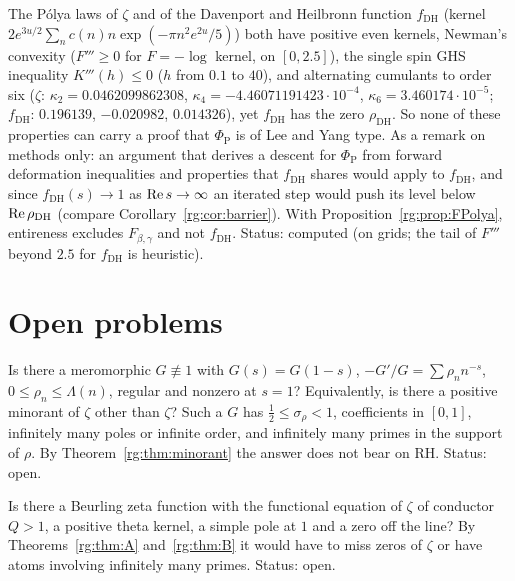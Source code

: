 \begin{remark}\label{rg:rem:dhtests}
The P\'olya laws of $\zeta$ and of the Davenport and Heilbronn function $f_{\mathrm{DH}}$ (kernel $2e^{3u/2}\sum_nc(n)n\exp(-\pi n^2e^{2u}/5)$) both have positive even kernels, Newman's convexity ($F'''\ge0$ for $F=-\log$ kernel, on $[0,2.5]$), the single spin GHS inequality $K'''(h)\le0$ ($h$ from $0.1$ to $40$), and alternating cumulants to order six ($\zeta$: $\kappa_2=0.0462099862308$, $\kappa_4=-4.46071191423\cdot10^{-4}$, $\kappa_6=3.460174\cdot10^{-5}$; $f_{\mathrm{DH}}$: $0.196139$, $-0.020982$, $0.014326$), yet $f_{\mathrm{DH}}$ has the zero $\rho_{\mathrm{DH}}$. So none of these properties can carry a proof that $\Phi_{\mathrm P}$ is of Lee and Yang type. As a remark on methods only: an argument that derives a descent for $\Phi_{\mathrm P}$ from forward deformation inequalities and properties that $f_{\mathrm{DH}}$ shares would apply to $f_{\mathrm{DH}}$, and since $f_{\mathrm{DH}}(s)\to1$ as $\operatorname{Re} s\to\infty$ an iterated step would push its level below $\operatorname{Re}\rho_{\mathrm{DH}}$ (compare Corollary~\ref{rg:cor:barrier}). With Proposition~\ref{rg:prop:FPolya}, entireness excludes $F_{\beta,\gamma}$ and not $f_{\mathrm{DH}}$. Status: computed (on grids; the tail of $F'''$ beyond $2.5$ for $f_{\mathrm{DH}}$ is heuristic).
\end{remark}

\section{Open problems}\label{rg:sec:open}

\begin{problem}\label{rg:prob:minorant}
Is there a meromorphic $G\not\equiv1$ with $G(s)=G(1-s)$, $-G'/G=\sum\rho_nn^{-s}$, $0\le\rho_n\le\Lambda(n)$, regular and nonzero at $s=1$? Equivalently, is there a positive minorant of $\zeta$ other than $\zeta$? Such a $G$ has $\frac12\le\sigma_\rho<1$, coefficients in $[0,1]$, infinitely many poles or infinite order, and infinitely many primes in the support of $\rho$. By Theorem~\ref{rg:thm:minorant} the answer does not bear on RH. Status: open.
\end{problem}

\begin{problem}\label{rg:prob:conductor}
Is there a Beurling zeta function with the functional equation of $\zeta$ of conductor $Q>1$, a positive theta kernel, a simple pole at $1$ and a zero off the line? By Theorems~\ref{rg:thm:A} and~\ref{rg:thm:B} it would have to miss zeros of $\zeta$ or have atoms involving infinitely many primes. Status: open.
\end{problem}

